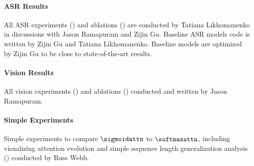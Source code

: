 \paragraph{ASR Results}
All ASR experiments () and ablations () are conducted by Tatiana Likhomanenko in discussions with Jason Ramapuram and Zijin Gu. Baseline ASR models code is written by Zijin Gu and Tatiana Likhomanenko. Baseline models are optimized by Zijin Gu to be close to state-of-the-art results.

\paragraph{Vision Results}
All vision experiments () and ablations () conducted and written by Jason Ramapuram.

\paragraph{Simple Experiments}
Simple experiments to compare $\sigmoidattn$ to $\softmaxattn$, including visualizing attention evolution and simple sequence length generalization analysis () conducted by Russ Webb.
